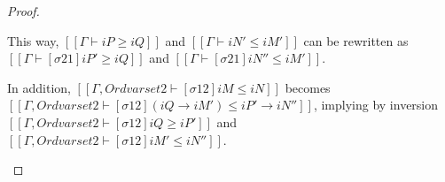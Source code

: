 \begin{proof}
\begin{caseof}
    This way, $[[Γ ⊢ iP ≥ iQ]]$ and $[[Γ ⊢ iN' ≤ iM']]$ can be rewritten as
    $[[Γ ⊢ [σ21]iP' ≥ iQ]]$ and $[[Γ ⊢ [σ21] iN'' ≤ iM']]$.

    In addition, $[[Γ, Ord varset2 ⊢ [σ12]iM ≤ iN]]$ becomes
    $[[Γ, Ord varset2 ⊢ [σ12](iQ → iM') ≤ iP' → iN'']]$,
    implying by inversion
    $[[Γ, Ord varset2 ⊢ [σ12]iQ ≥ iP']]$ and
    $[[Γ, Ord varset2 ⊢ [σ12]iM' ≤ iN'']]$.

  \end{caseof}
\end{proof}





















